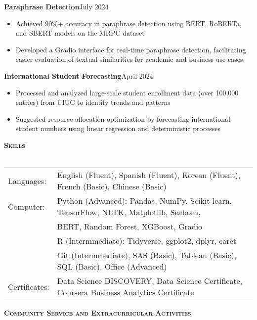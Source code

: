 \documentclass[a4paper]{article}
\newcommand{\lineunder} {
    \vspace*{-8pt} \\
    \hspace*{-18pt} \hrulefill \\
}
\newcommand{\header} [1] {
    {\hspace*{-18pt}\vspace*{6pt} \textsc{#1}}
    \vspace*{-6pt} \lineunder
}
\begin{document}
\textbf{Paraphrase Detection}\hfill{July 2024}\\
\begin{itemize}[nolistsep]
    \item Achieved 90\%+ accuracy in paraphrase detection using BERT, RoBERTa,
     and SBERT models on the MRPC dataset
    \item Developed a Gradio interface for real-time paraphrase detection, facilitating easier evaluation 
    of textual similarities for academic and business use cases.
\end{itemize}

\textbf{International Student Forecasting}\hfill{April 2024}\\
\begin{itemize}[nolistsep]
    \item Processed and analyzed large-scale student enrollment data 
    (over 100,000 entries) from UIUC to identify trends and patterns
    \item Suggested resource allocation optimization by forecasting 
    international student numbers using linear regression and deterministic processes
    \end{itemize}



\vspace*{1mm}

\header{\textbf{Skills}}
\begin{tabular}{ l l }
    Languages: & English (Fluent), Spanish (Fluent), Korean (Fluent), French (Basic), Chinese (Basic)              \\
    Computer: & Python (Advanced): Pandas, NumPy, Scikit-learn, TensorFlow, 
    NLTK, Matplotlib, Seaborn, \\
    & BERT, Random Forest, XGBoost, Gradio\\
    & R (Intermmediate): Tidyverse, ggplot2, dplyr, caret\\
    & Git (Intermmediate), SAS (Basic), Tableau (Basic), SQL (Basic), Office (Advanced)\\
    Certificates: & Data Science DISCOVERY, Data Science Certificate, 
    Coursera Business Analytics Certificate
\end{tabular}


\vspace{1mm}


\header{\textbf{Community Service and Extracurricular Activities}}
\end{document}
